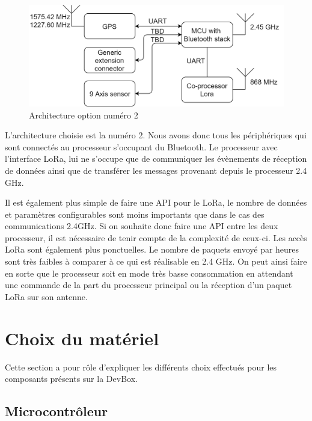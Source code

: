 \begin{figure}[ht!]
    \centering
    \includegraphics[width=\textwidth]{Figures/hardware/master_onepage_option2.png}
    \caption{Architecture option numéro 2}
    \label{fig:hardware_option2}
\end{figure}

L'architecture choisie est la numéro 2. Nous avons donc tous les périphériques qui sont connectés au processeur s'occupant du Bluetooth. Le processeur avec l'interface LoRa, lui ne s'occupe que de communiquer les évènements de réception de données ainsi que de transférer les messages provenant depuis le processeur 2.4 GHz.

Il est également plus simple de faire une API pour le LoRa, le nombre de données et paramètres configurables sont moins importants que dans le cas des communications 2.4GHz. Si on souhaite donc faire une API entre les deux processeur, il est nécessaire de tenir compte de la complexité de ceux-ci. Les accès LoRa sont également plus ponctuelles. Le nombre de paquets envoyé par heures sont très faibles à comparer à ce qui est réalisable en 2.4 GHz. On peut ainsi faire en sorte que le processeur soit en mode très basse consommation en attendant une commande de la part du processeur principal ou la réception d'un paquet LoRa sur son antenne.


\section{Choix du matériel}

Cette section a pour rôle d'expliquer les différents choix effectués pour les composants présents sur la DevBox. 

\subsection{Microcontrôleur}
\label{subsect:microcontroleur}


